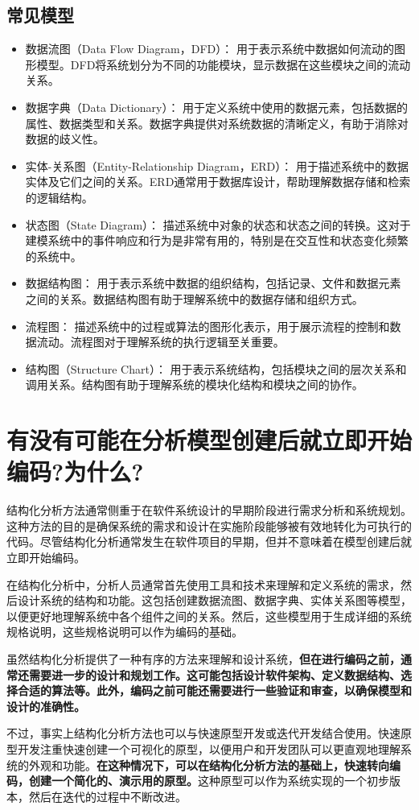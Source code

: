 \documentclass[11pt, a4paper, oneside]{ctexbook}
\begin{document}
\section{常见模型}
\begin{itemize}
    \item 数据流图（Data Flow Diagram，DFD）： 用于表示系统中数据如何流动的图形模型。DFD将系统划分为不同的功能模块，显示数据在这些模块之间的流动关系。
    \item 数据字典（Data Dictionary）： 用于定义系统中使用的数据元素，包括数据的属性、数据类型和关系。数据字典提供对系统数据的清晰定义，有助于消除对数据的歧义性。
    \item 实体-关系图（Entity-Relationship Diagram，ERD）： 用于描述系统中的数据实体及它们之间的关系。ERD通常用于数据库设计，帮助理解数据存储和检索的逻辑结构。
    \item 状态图（State Diagram）： 描述系统中对象的状态和状态之间的转换。这对于建模系统中的事件响应和行为是非常有用的，特别是在交互性和状态变化频繁的系统中。
    \item 数据结构图： 用于表示系统中数据的组织结构，包括记录、文件和数据元素之间的关系。数据结构图有助于理解系统中的数据存储和组织方式。
    \item 流程图： 描述系统中的过程或算法的图形化表示，用于展示流程的控制和数据流动。流程图对于理解系统的执行逻辑至关重要。
    \item 结构图（Structure Chart）： 用于表示系统结构，包括模块之间的层次关系和调用关系。结构图有助于理解系统的模块化结构和模块之间的协作。
\end{itemize}
\chapter{有没有可能在分析模型创建后就立即开始编码?为什么?}
结构化分析方法通常侧重于在软件系统设计的早期阶段进行需求分析和系统规划。这种方法的目的是确保系统的需求和设计在实施阶段能够被有效地转化为可执行的代码。尽管结构化分析通常发生在软件项目的早期，但并不意味着在模型创建后就立即开始编码。

在结构化分析中，分析人员通常首先使用工具和技术来理解和定义系统的需求，然后设计系统的结构和功能。这包括创建数据流图、数据字典、实体关系图等模型，以便更好地理解系统中各个组件之间的关系。然后，这些模型用于生成详细的系统规格说明，这些规格说明可以作为编码的基础。

虽然结构化分析提供了一种有序的方法来理解和设计系统，\textbf{但在进行编码之前，通常还需要进一步的设计和规划工作。这可能包括设计软件架构、定义数据结构、选择合适的算法等。此外，编码之前可能还需要进行一些验证和审查，以确保模型和设计的准确性。}

不过，事实上结构化分析方法也可以与快速原型开发或迭代开发结合使用。快速原型开发注重快速创建一个可视化的原型，以便用户和开发团队可以更直观地理解系统的外观和功能。\textbf{在这种情况下，可以在结构化分析方法的基础上，快速转向编码，创建一个简化的、演示用的原型。}这种原型可以作为系统实现的一个初步版本，然后在迭代的过程中不断改进。
\end{document}
